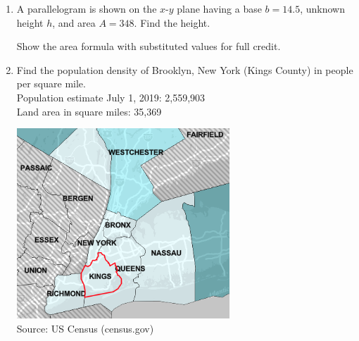 \documentclass[12pt, twoside]{article}
\begin{document}
\begin{enumerate}
  
\newpage
\item A parallelogram is shown on the $x$-$y$ plane having a base $b=14.5$, unknown height $h$, and area $A=348$. Find the height. 
  \begin{multicols}{2}
    Show the area formula with substituted values for full credit.
      \begin{flushright}
      \end{flushright}
  \end{multicols} 

\newpage
\item Find the population density of Brooklyn, New York (Kings County) in people per square mile.\\[0.5cm]
Population estimate July 1, 2019: 2,559,903\\[0.25cm]
Land area in square miles: 35,369
\begin{flushright}
  \includegraphics[width=8cm]{6-15-7-Brooklyn.png}\\
  Source: US Census (census.gov)
\end{flushright}


\end{enumerate}
\end{document}
